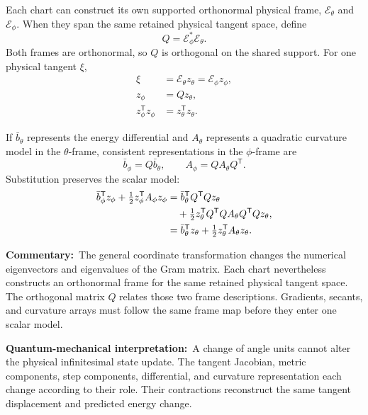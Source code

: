 \documentclass[10pt,twocolumn]{article}
\newcommand{\commentary}[1]{\par\noindent\textbf{Commentary:}\ #1\par}
\newcommand{\phys}[1]{\par\noindent\textbf{Quantum-mechanical interpretation:}\ #1\par}
\begin{document}
Each chart can construct its own supported orthonormal physical frame,
\(\mathcal E_\theta\) and \(\mathcal E_\phi\). When they span the same retained
physical tangent space, define
\begin{equation}
Q=\mathcal E_\phi^*\mathcal E_\theta.
\label{eq:bridge-frame-chart-alignment}
\end{equation}
Both frames are orthonormal, so \(Q\) is orthogonal on the shared support. For
one physical tangent \(\xi\),
\begin{align}
\xi&=\mathcal E_\theta z_\theta
=\mathcal E_\phi z_\phi,
\label{eq:bridge-same-tangent-two-frames}\\
z_\phi&=Qz_\theta,
\label{eq:bridge-whitened-chart-rule}\\
z_\phi^{\mathsf T}z_\phi
&=z_\theta^{\mathsf T}z_\theta.
\label{eq:bridge-whitened-length-invariance}
\end{align}

If \(\bar b_\theta\) represents the energy differential and \(A_\theta\)
represents a quadratic curvature model in the \(\theta\)-frame, consistent
representations in the \(\phi\)-frame are
\begin{equation}
\bar b_\phi=Q\bar b_\theta,
\qquad
A_\phi=QA_\theta Q^{\mathsf T}.
\label{eq:bridge-gradient-curvature-frame-rule}
\end{equation}
Substitution preserves the scalar model:
\begin{align}
\bar b_\phi^{\mathsf T}z_\phi
+\tfrac12z_\phi^{\mathsf T}A_\phi z_\phi
&=\bar b_\theta^{\mathsf T}Q^{\mathsf T}Qz_\theta
\notag\\
&\quad+\tfrac12z_\theta^{\mathsf T}
Q^{\mathsf T}QA_\theta Q^{\mathsf T}Qz_\theta,
\label{eq:bridge-model-invariance-1}\\
&=\bar b_\theta^{\mathsf T}z_\theta
+\tfrac12z_\theta^{\mathsf T}A_\theta z_\theta.
\label{eq:bridge-model-invariance-2}
\end{align}

\commentary{The general coordinate transformation changes the numerical
eigenvectors and eigenvalues of the Gram matrix. Each chart nevertheless
constructs an orthonormal frame for the same retained physical tangent space.
The orthogonal matrix \(Q\) relates those two frame descriptions. Gradients,
secants, and curvature arrays must follow the same frame map before they enter
one scalar model.}

\phys{A change of angle units cannot alter the physical infinitesimal state
update. The tangent Jacobian, metric components, step components, differential,
and curvature representation each change according to their role. Their
contractions reconstruct the same tangent displacement and predicted energy
change.}
\end{document}
